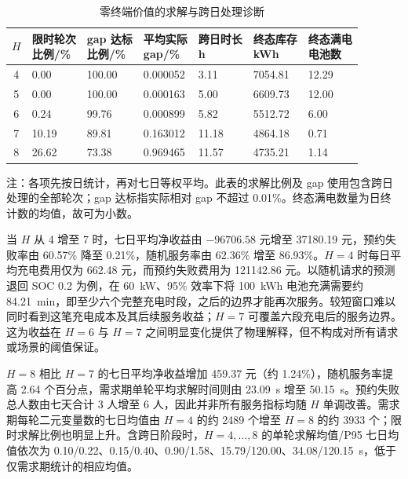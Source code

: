 \begin{table}[!htbp]
  \centering
  \caption{零终端价值的求解与跨日处理诊断}
  \label{exp:zero_diagnostics}
  \small
  \setlength{\tabcolsep}{3pt}
  \begin{tabularx}{\linewidth}{@{}cXXXXXX@{}}
    \toprule
    $H$ & \shortstack{限时轮次\\比例/\%} & \shortstack{gap 达标\\比例/\%} & \shortstack{平均实际\\gap/\%} & \shortstack{跨日时长\\h} & \shortstack{终态库存\\kWh} & \shortstack{终态满电\\电池数} \\
    \midrule
    4 & 0.00 & 100.00 & 0.000052 & 3.11 & 7054.81 & 12.29 \\
    5 & 0.00 & 100.00 & 0.000163 & 5.00 & 6609.73 & 12.00 \\
    6 & 0.24 & 99.76 & 0.000899 & 5.82 & 5512.72 & 6.00 \\
    7 & 10.19 & 89.81 & 0.163012 & 11.18 & 4864.18 & 0.71 \\
    8 & 26.62 & 73.38 & 0.969465 & 11.57 & 4735.21 & 1.14 \\
    \bottomrule
  \end{tabularx}
  \par\smallskip
  \parbox{\linewidth}{\footnotesize 注：各项先按日统计，再对七日等权平均。此表的求解比例及 gap 使用包含跨日处理的全部轮次；gap 达标指实际相对 gap 不超过 0.01\%。终态满电数量为日终计数的均值，故可为小数。}
\end{table}

当 $H$ 从 4 增至 7 时，七日平均净收益由 $-96706.58$ 元增至 37180.19 元，预约失败率由 60.57\% 降至 0.21\%，随机服务率由 62.36\% 增至 86.93\%。$H=4$ 时每日平均充电费用仅为 662.48 元，而预约失败费用为 121142.86 元。以随机请求的预测退回 SOC 0.2 为例，在 60~kW、95\% 效率下将 100~kWh 电池充满需要约 84.21~min，即至少六个完整充电时段，之后的边界才能再次服务。较短窗口难以同时看到这笔充电成本及其后续服务收益；$H=7$ 可覆盖六段充电后的服务边界。这为收益在 $H=6$ 与 $H=7$ 之间明显变化提供了物理解释，但不构成对所有请求或场景的阈值保证。

$H=8$ 相比 $H=7$ 的七日平均净收益增加 459.37 元（约 1.24\%），随机服务率提高 2.64 个百分点，需求期单轮平均求解时间则由 23.09~s 增至 50.15~s。预约失败总人数由七天合计 3 人增至 6 人，因此并非所有服务指标均随 $H$ 单调改善。需求期每轮二元变量数的七日均值由 $H=4$ 的约 2489 个增至 $H=8$ 的约 3933 个；限时求解比例也明显上升。含跨日阶段时，$H=4,\ldots,8$ 的单轮求解均值/P95 七日均值依次为 0.10/0.22、0.15/0.40、0.90/1.58、15.79/120.00、34.08/120.15~s，低于仅需求期统计的相应均值。

